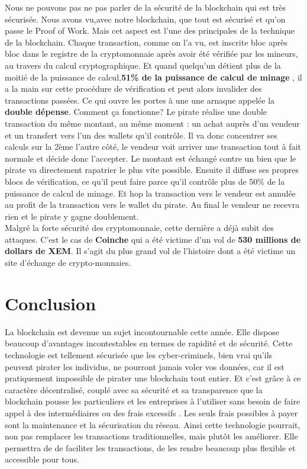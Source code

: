 \documentclass[12pt]{report}
\begin{document}
\hspace{1cm} Nous ne pouvons pas ne pas parler de la sécurité de la blockchain qui est très sécurisée. Nous avons vu,avec notre blockchain, que tout est sécurisé et qu'on passe le Proof of Work. Mais cet aspect est l'une des principales de la technique de la blockchain. Chaque transaction, comme on l'a vu, est inscrite bloc après bloc dans le registre de la cryptomonnaie après avoir été vérifiée par les mineurs, au travers du calcul cryptographique. Et quand quelqu’un détient plus de la moitié de la puissance de calcul,\textbf{51\% de la puissance de calcul de minage} , il a la main sur cette procédure de vérification et peut alors invalider des transactions passées. Ce qui ouvre les portes à une une arnaque appelée la  \textbf{double dépense}. Comment ça fonctionne? Le pirate réalise une double transaction du même montant, au même moment : un achat auprès d'un vendeur et un transfert vers l'un des wallets qu'il contrôle. Il va donc concentrer ses calculs sur la 2ème l'autre côté, le vendeur voit arriver une transaction tout à fait normale et décide donc l’accepter. Le montant est échangé contre un bien que le pirate va directement rapatrier le plus vite possible. Ensuite il diffuse ses propres blocs de vérification, ce qu'il peut faire parce qu'il contrôle plus de 50\% de la puissance de calcul de minage. Et hop la transaction vers le vendeur est annulée au profit de la transaction vers le wallet du pirate. Au final le vendeur ne recevra rien et le pirate y gagne doublement.\\
Malgré la forte sécurité des cryptomonnaie, cette dernière a déjà subit des attaques. C'est le cas de \textbf{Coinche} qui a été victime d'un vol de \textbf{530 millions de dollars de XEM}. Il s'agit du plus grand vol de l’histoire dont a été victime un site d’échange de crypto-monnaies.

\newpage    
\section{Conclusion}

\hspace{1cm} La blockchain est devenue un sujet incontournable cette année. Elle dispose beaucoup d'avantages incontestables en termes de rapidité et de sécurité. Cette technologie est tellement sécurisée que les cyber-criminels, bien vrai qu'ils peuvent pirater les individus, ne pourront jamais  voler vos données, car il est pratiquement impossible de pirater une blockchain tout entier. Et c'est grâce à ce caractère décentralisé, couplé avec sa sécurité et sa transparence que la blockchain pousse les particuliers et les entreprises à l'utiliser sans besoin de faire appel à des intermédiaires ou des frais excessifs . Les seuls frais possibles à payer sont la maintenance et la sécurisation du réseau. Ainsi cette technologie pourrait, non pas remplacer les transactions traditionnelles, mais plutôt les améliorer. Elle permettra de de faciliter les transactions, de les rendre beaucoup plus flexible et accessible pour tous. \\ 
\end{document}
